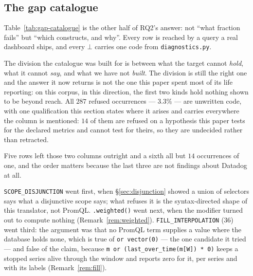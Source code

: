 \subsection{The gap catalogue}
\label{sec:gaps}

Table~\ref{tab:gap-catalogue} is the other half of RQ2's answer: not ``what fraction
fails'' but ``which constructs, and why''. Every row is reached by a query a real
dashboard ships, and every $\bot$ carries one code from \texttt{diagnostics.py}.

\begin{table}[htbp]\centering\scriptsize

\caption{The gaps, by occurrence. ``Share'' is of all Datadog query occurrences in the
corpus.}
\label{tab:gap-catalogue}
\end{table}

The division the catalogue was built for is between what the target cannot
\emph{hold}, what it cannot \emph{say}, and what we have not \emph{built}. The division
is still the right one and the answer it now returns is not the one this paper spent
most of its life reporting: on this corpus, in this direction, the first two kinds hold
nothing shown to be beyond reach. All $287$ refused occurrences --- $3.3\%$ --- are
unwritten code, with one qualification this section states where it arises and carries
everywhere the column is mentioned: $14$ of them are refused on a hypothesis this paper
tests for the declared metrics and cannot test for theirs, so they are undecided rather
than retracted.

Five rows left those two columns outright and a sixth all but $14$ occurrences of
one, and the order matters because the last three are not findings about Datadog
at all.

\texttt{SCOPE\_DISJUNCTION} went first, when \S\ref{sec:disjunction} showed a union of
selectors says what a disjunctive scope says; what refuses it is the syntax-directed
shape of this translator, not PromQL. \texttt{.weighted()} went next, when the modifier
turned out to compute nothing (Remark~\ref{rem:weighted}). \texttt{FILL\_INTERPOLATION}
($36$) went third: the argument was that no PromQL term supplies a value where the
database holds none, which is true of \texttt{or vector(0)} --- the one candidate it
tried --- and false of the claim, because
\texttt{m or (last\_over\_time(m[W]) * 0)} keeps a stopped series alive through the
window and reports zero for it, per series and with its labels
(Remark~\ref{rem:fill}).

